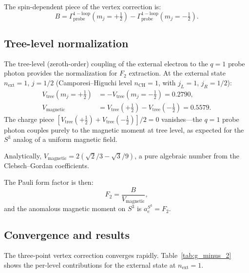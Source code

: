 \documentclass[11pt]{article}
\begin{document}
The spin-dependent piece of the vertex correction is:
\begin{equation}
  B = \Gamma^{\mathrm{1-loop}}_{\mathrm{probe}}(m_j = +\tfrac{1}{2})
    - \Gamma^{\mathrm{1-loop}}_{\mathrm{probe}}(m_j = -\tfrac{1}{2}).
  \label{eq:B_three_point}
\end{equation}

\subsection{Tree-level normalization}

The tree-level (zeroth-order) coupling of the external electron to the
$q = 1$ probe photon provides the normalization for $F_2$ extraction.
At the external state $n_{\mathrm{ext}} = 1$, $j = 1/2$
(Camporesi--Higuchi level $n_{\mathrm{CH}} = 1$, with
$j_L = 1$, $j_R = 1/2$):
\begin{align}
  V_{\mathrm{tree}}(m_j = +\tfrac{1}{2})
    &= -V_{\mathrm{tree}}(m_j = -\tfrac{1}{2})
    = 0.2790,
  \label{eq:V_tree} \\
  V_{\mathrm{magnetic}}
    &= V_{\mathrm{tree}}(+\tfrac{1}{2})
     - V_{\mathrm{tree}}(-\tfrac{1}{2})
    = 0.5579.
  \label{eq:V_magnetic}
\end{align}
The charge piece
$[V_{\mathrm{tree}}(+\tfrac{1}{2}) + V_{\mathrm{tree}}(-\tfrac{1}{2})]/2
= 0$
vanishes---the $q = 1$ probe photon couples purely to the magnetic
moment at tree level, as expected for the $S^3$ analog of a uniform
magnetic field.

Analytically, $V_{\mathrm{magnetic}} = 2(\sqrt{2}/3 - \sqrt{3}/9)$,
a pure algebraic number from the Clebsch--Gordan coefficients.

The Pauli form factor is then:
\begin{equation}
  F_2 = \frac{B}{V_{\mathrm{magnetic}}},
  \label{eq:F2_def}
\end{equation}
and the anomalous magnetic moment on $S^3$ is $a_e^{S^3} = F_2$.

\subsection{Convergence and results}

The three-point vertex correction converges rapidly.  Table~\ref{tab:g_minus_2}
shows the per-level contributions for the external state at
$n_{\mathrm{ext}} = 1$.
\end{document}
